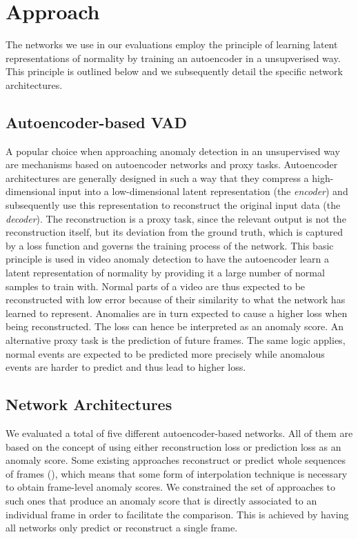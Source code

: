 \documentclass[10pt,twocolumn,letterpaper]{article}
\begin{document}
\section{Approach} \label{sec:approach}
The networks we use in our evaluations employ the principle of learning latent representations of normality by training an autoencoder in a unsupverised way. This principle is outlined below and we subsequently detail the specific network architectures.

\subsection{Autoencoder-based VAD} \label{subsec:approach_ae_vad}
A popular choice when approaching anomaly detection in an unsupervised way are mechanisms based on autoencoder networks and proxy tasks. Autoencoder architectures are generally designed in such a way that they compress a high-dimensional input into a low-dimensional latent representation (\ie the \emph{encoder}) and subsequently use this representation to reconstruct the original input data (\ie the \emph{decoder}). The reconstruction is a proxy task, since the relevant output is not the reconstruction itself, but its deviation from the ground truth, which is captured by a loss function and governs the training process of the network. This basic principle is used in video anomaly detection to have the autoencoder learn a latent representation of normality by providing it a large number of normal samples to train with. Normal parts of a video are thus expected to be reconstructed with low error because of their similarity to what the network has learned to represent. Anomalies are in turn expected to cause a higher loss when being reconstructed. The loss can hence be interpreted as an anomaly score. An alternative proxy task is the prediction of future frames. The same logic applies, normal events are expected to be predicted more precisely while anomalous events are harder to predict and thus lead to higher loss.

\subsection{Network Architectures}
We evaluated a total of five different autoencoder-based networks. All of them are based on the concept of using either reconstruction loss or prediction loss as an anomaly score. Some existing approaches reconstruct or predict whole sequences of frames (\eg \cite{conv_ae_ad}), which means that some form of interpolation technique is necessary to obtain frame-level anomaly scores. We constrained the set of approaches to such ones that produce an anomaly score that is directly associated to an individual frame in order to facilitate the comparison. This is achieved by having all networks only predict or reconstruct a single frame.
\end{document}
